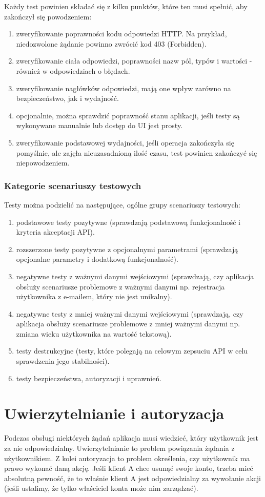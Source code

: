	Każdy test powinien składać się z kilku punktów, które ten musi spełnić, aby zakończył się powodzeniem:
	\begin{enumerate}
		\item zweryfikowanie poprawności kodu odpowiedzi HTTP. Na przykład, niedozwolone żądanie powinno zwrócić kod 403 (Forbidden).
		\item zweryfikowanie ciała odpowiedzi, poprawności nazw pól, typów i wartości - również w odpowiedziach o błędach.
		\item zweryfikowanie nagłówków odpowiedzi, mają one wpływ zarówno na bezpieczeństwo, jak i wydajność.
		\item opcjonalnie, można sprawdzić poprawność stanu aplikacji, jeśli testy są wykonywane manualnie lub dostęp do UI jest prosty.
		\item zweryfikowanie podstawowej wydajności, jeśli operacja zakończyła się pomyślnie, ale zajęła nieuzasadnioną ilość czasu, test powinien zakończyć się niepowodzeniem.
	\end{enumerate}

	\subsubsection{Kategorie scenariuszy testowych}
	Testy można podzielić na następujące, ogólne grupy scenariuszy testowych:
	\begin{enumerate}
		\item podstawowe testy pozytywne (sprawdzają podstawową funkcjonalność i kryteria akceptacji API).
		\item rozszerzone testy pozytywne z opcjonalnymi parametrami (sprawdzają opcjonalne parametry i dodatkową funkcjonalność).
		\item negatywne testy z ważnymi danymi wejściowymi (sprawdzają, czy aplikacja obsłuży scenariusze problemowe z ważnymi danymi np. rejestracja użytkownika z e-mailem, który nie jest unikalny).
		\item negatywne testy z mniej ważnymi danymi wejściowymi (sprawdzają, czy aplikacja obsłuży scenariusze problemowe z mniej ważnymi danymi np. zmiana wieku użytkownika na wartość tekstową).
		\item testy destrukcyjne (testy, które polegają na celowym zepsuciu API w celu sprawdzenia jego stabilności).
		\item testy bezpieczeństwa, autoryzacji i uprawnień.
	\end{enumerate}
	

\section{Uwierzytelnianie i autoryzacja}
	Podczas obsługi niektórych żądań aplikacja musi wiedzieć, który użytkownik jest za nie odpowiedzialny. Uwierzytelnianie to problem powiązania żądania z użytkownikiem. Z kolei autoryzacja to problem określenia, czy użytkownik ma prawo wykonać daną akcję. Jeśli klient A chce usunąć swoje konto, trzeba mieć absolutną pewność, że to właśnie klient A jest odpowiedzialny za wywołanie akcji (jeśli ustalimy, że tylko właściciel konta może nim zarządzać).
	
